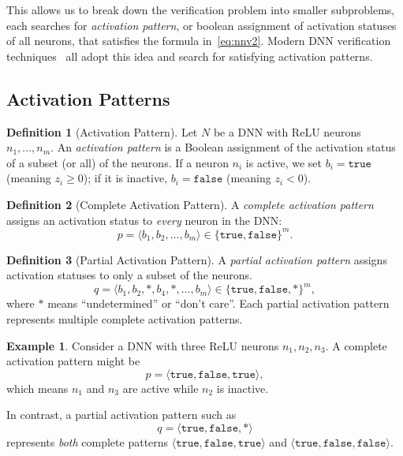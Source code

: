 \documentclass[oneside,11pt,dvipsnames]{book}
\numberwithin{equation}{section}
\theoremstyle{definition}
\newtheorem{definition}{Definition}[section]
\newtheorem{example}{Example}[section]
\theoremstyle{remark}
\begin{document}
This allows us to break down the verification problem into smaller subproblems, each searches for \emph{activation pattern}, or boolean assignment of activation statuses of all neurons, that satisfies the formula in~\autoref{eq:nnv2}.
Modern DNN verification techniques~\cite{bunel2020branch,wang2021beta,ferrari2022complete,duong2024harnessing,duong2023dpllt,ovalbab,katz2019marabou,bak2021nnenum} all adopt this idea and search for satisfying activation patterns.

\subsection{Activation Patterns}
\begin{definition}[Activation Pattern]\label{def:activation-pattern}
Let $N$ be a DNN with ReLU neurons $n_1,\dots,n_m$.  
An \emph{activation pattern} is a Boolean assignment of the activation status of a subset (or all) of the neurons.  
If a neuron $n_i$ is active, we set $b_i = \texttt{true}$ (meaning $z_i \geq 0$); if it is inactive, $b_i = \texttt{false}$ (meaning $z_i < 0$). 
\end{definition}

\begin{definition}[Complete Activation Pattern]\label{def:complete-pattern}
A \emph{complete activation pattern} assigns an activation status to \emph{every} neuron in the DNN:
\[
p = \langle b_1, b_2, \dots, b_m \rangle \in \{\texttt{true},\texttt{false}\}^m .
\]
\end{definition}


\begin{definition}[Partial Activation Pattern]\label{def:partial-pattern}
A \emph{partial activation pattern} assigns activation statuses to only a subset of the neurons.  
\[
q = \langle b_1, b_2, *, b_4, *, \dots, b_m \rangle \in \{\texttt{true},\texttt{false},*\}^m ,
\]
where $*$ means ``undetermined'' or ``don't care''. Each partial activation pattern represents multiple complete activation patterns.
\end{definition}


\begin{example}  
Consider a DNN with three ReLU neurons $n_1,n_2,n_3$.  
A complete activation pattern might be 
\[
p = \langle \texttt{true}, \texttt{false}, \texttt{true} \rangle ,
\]
which means $n_1$ and $n_3$ are active while $n_2$ is inactive.  


In contrast, a partial activation pattern such as
\[
q = \langle \texttt{true}, \texttt{false}, * \rangle
\]
represents \emph{both} complete patterns  
$\langle \texttt{true}, \texttt{false}, \texttt{true} \rangle$ and  
$\langle \texttt{true}, \texttt{false}, \texttt{false} \rangle$.  
\end{example}
\end{document}
